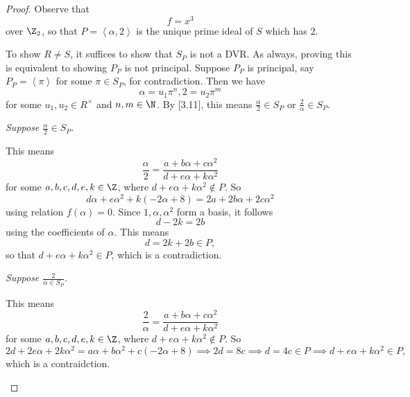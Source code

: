 \documentclass[pmath441]{subfiles}
\begin{document}
    \begin{proof}
        Observe that
        \begin{equation*}
            f = x^{3}
        \end{equation*}
        over $\Z_2$, so that $P = \left< \alpha,2 \right>$ is the unique prime ideal of $S$ which has $2$. 

        To show $R\neq S$, it suffices to show that $S_P$ is not a DVR. As always, proving this is equivalent to showing $P_P$ is not principal. Suppose $P_P$ is principal, say $P_P = \left< \pi \right>$ for some $\pi\in S_P$, for contradiction. Then we have
        \begin{equation*}
            \alpha = u_1\pi^n, 2=u_2\pi^m
        \end{equation*}
        for some $u_1,u_2\in R^{\times}$ and $n,m\in\N$. By [3.11], this means $\frac{\alpha}{2}\in S_P$ or $\frac{2}{\alpha}\in S_P$.

        \begin{case}
            \textit{Suppose $\frac{\alpha}{2}\in S_P$.}

            This means
            \begin{equation*}
                \frac{\alpha}{2} = \frac{a+b\alpha+c\alpha^{2}}{d+e\alpha+k\alpha^{2}}
            \end{equation*}
            for some $a,b,c,d,e,k\in\Z$, where $d+e\alpha+k\alpha^{2}\notin P$. So
            \begin{equation*}
                d\alpha+e\alpha^{2}+k\left( -2\alpha+8 \right) = 2a+2b\alpha+2c\alpha^{2}
            \end{equation*}
            using relation $f\left( \alpha \right) = 0$. Since $1,\alpha,\alpha^{2}$ form a basis, it follows
            \begin{equation*}
                d-2k = 2b
            \end{equation*}
            using the coefficients of $\alpha$. This means
            \begin{equation*}
                d = 2k+2b\in P,
            \end{equation*}
            so that $d+e\alpha+k\alpha^{2}\in P$, which is a contradiction.
        \end{case}

        \begin{case}
            \textit{Suppose $\frac{2}{\alpha\in S_P}$.}

            This means 
            \begin{equation*}
                \frac{2}{\alpha} = \frac{a+b\alpha+c\alpha^{2}}{d+e\alpha+k\alpha^{2}}
            \end{equation*}
            for some $a,b,c,d,e,k\in\Z$, where $d+e\alpha+k\alpha^{2}\notin P$. So
            \begin{equation*}
                2d+2e\alpha+2k\alpha^{2} = a\alpha+b\alpha^{2}+c\left( -2\alpha+8 \right) \implies 2d = 8c \implies d = 4c\in P \implies d+e\alpha+k\alpha^{2}\in P,
            \end{equation*}
            which is a contraidction.
        \end{case}
    \end{proof}
\end{document}
